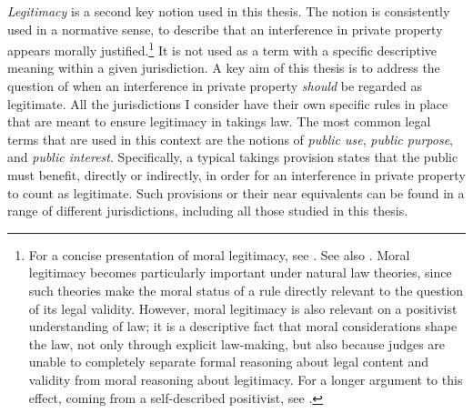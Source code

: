 
{\it Legitimacy} is a second key notion used in this thesis. The notion is consistently used in a normative sense, to describe that an interference in private property appears morally justified.\footnote{For a concise presentation of moral legitimacy, see \cite[438-441]{thomas14}. See also \cite{michelman04,priel11}. Moral legitimacy becomes particularly important under natural law theories, since such theories make the moral status of a rule directly relevant to the question of its legal validity. However, moral legitimacy is also relevant on a positivist understanding of law; it is a descriptive fact that moral considerations shape the law, not only through explicit law-making, but also because judges are unable to completely separate formal reasoning about legal content and validity from moral reasoning about legitimacy. For a longer argument to this effect, coming from a self-described positivist, see \cite[1801-1802]{fallon05}.} It is not used as a term with a specific descriptive meaning within a given jurisdiction. A key aim of this thesis is to address the question of when an interference in private property {\it should} be regarded as legitimate. All the jurisdictions I consider have their own specific rules in place that are meant to ensure legitimacy in takings law. The most common legal terms that are used in this context are the notions of {\it public use}, {\it public purpose}, and {\it public interest}. Specifically, a typical takings provision states that the public must benefit, directly or indirectly, in order for an interference in private property to count as legitimate. Such provisions or their near equivalents can be found in a range of different jurisdictions, including all those studied in this thesis.

